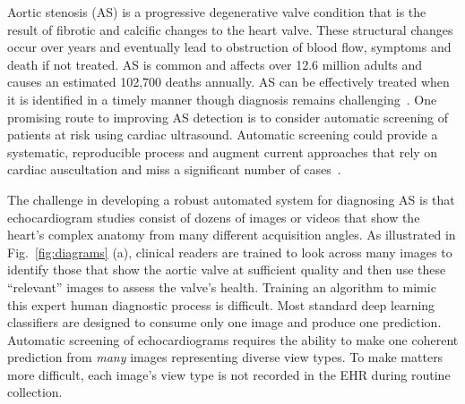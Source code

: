 Aortic stenosis (AS) is a progressive degenerative valve condition that is the result of fibrotic and calcific changes to the heart valve. These structural changes occur over years and eventually lead to obstruction of blood flow, symptoms and death if not treated. AS is common and affects over 12.6 million adults and causes an estimated 102,700 deaths annually. AS can be effectively treated when it is identified in a timely manner though diagnosis remains challenging~\citep{yadgir2020global}. One promising route to improving AS detection is to consider automatic screening of patients at risk using cardiac ultrasound. Automatic screening could provide a systematic, reproducible process and augment current approaches that rely on cardiac auscultation and miss a significant number of cases~\citep{gardezi2018cardiac}.






The challenge in developing a robust automated system for diagnosing AS is that echocardiogram studies consist of dozens of images or videos that show the heart’s complex anatomy from many different acquisition angles. As illustrated in Fig.~\ref{fig:diagrams} (a), clinical readers are trained to look across many images to identify those that show the aortic valve at sufficient quality and then use these “relevant” images to assess the valve’s health. Training an algorithm to mimic this expert human diagnostic process is difficult. Most standard deep learning classifiers are designed to consume only one image and produce one prediction. Automatic screening of echocardiograms requires the ability to make one coherent prediction from \emph{many} images representing diverse view types. To make matters more difficult, each image’s view type is not recorded in the EHR during routine collection.


